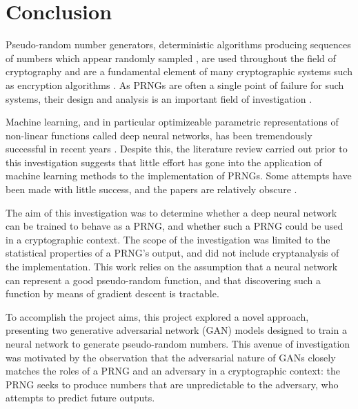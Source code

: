 \documentclass[12pt, titlepage]{report}
\theoremstyle{definition}
\begin{document}
\chapter{Conclusion}\label{chapter:conclusion}
Pseudo-random number generators, deterministic algorithms producing sequences of numbers which appear randomly sampled \cite[p. 7]{barker2007recommendation}, are used throughout the field of cryptography and are a fundamental element of many cryptographic systems such as encryption algorithms  \cite[p. 169]{menezes1996handbook} \cite[p. 1]{kelsey1998cryptanalytic}. As PRNGs are often a single point of failure for such systems, their design and analysis is an important field of investigation \cite[p. 2]{kelsey1998cryptanalytic} \cite{deng2017developments}. 

Machine learning, and in particular optimizeable parametric representations of non-linear functions called deep neural networks, has been tremendously successful in recent years \cite[p. 24-29]{russel2009artificial}. Despite this, the literature review carried out prior to this investigation suggests that little effort has gone into the application of machine learning methods to the implementation of PRNGs. Some attempts have been made with little success, and the papers are relatively obscure \cite{desai2011pseudo} \cite{desai2012pseudo} \cite{tirdad2010hopfield}.

The aim of this investigation was to determine whether a deep neural network can be trained to behave as a PRNG, and whether such a PRNG could be used in a cryptographic context. The scope of the investigation was limited to the statistical properties of a PRNG's output, and did not include cryptanalysis of the implementation. This work relies on the assumption that a neural network can represent a good pseudo-random function, and that discovering such a function by means of gradient descent is tractable. 

To accomplish the project aims, this project explored a novel approach, presenting two generative adversarial network (GAN) models designed to train a neural network to generate pseudo-random numbers. This avenue of investigation was motivated by the observation that the adversarial nature of GANs closely matches the roles of a PRNG and an adversary in a cryptographic context: the PRNG seeks to produce numbers that are unpredictable to the adversary, who attempts to predict future outputs. 
\end{document}
